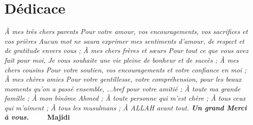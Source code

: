 \chapter*{Dédicace}
\begin{large}
\begin{center}
\centering

\noindent\textit{
À mes très chers parents 
\newline
Pour votre amour, vos encouragements, vos sacrifices et vos prières 
\newline
Aucun mot ne saura exprimer mes sentiments d’amour, de respect et de gratitude envers vous ; 
\newline
À mes chers frères et sœurs 
\newline
Pour tout ce que vous avez fait pour moi, Je vous souhaite une vie pleine de 
\newline
bonheur et de succès ; 
\newline
À mes chers cousins 
\newline
Pour votre soutien, vos encouragements et votre confiance en moi ; 
\newline
À mes chères amies 
\newline
Pour votre gentillesse, votre compréhension, pour les beaux moments qu’on a passé ensemble, ...bref pour votre amitié ; 
\newline
À toute ma grande famille ; 
\newline
À mon binôme Ahmed ; 
\newline
À toute personne qui m’est chère ; 
\newline
À tous ceux qui m’aiment ; 
\newline
À tous les musulmans ; 
\newline
À ALLAH avant tout. 
\newline
\newline
\textbf{Un grand Merci à vous.}
\newline
}
\newline
\raggedleft\textbf{\textcolor{white}{text}}
\hfill \textbf{Majidi}
\end{center}
\end{large}
\clearpage